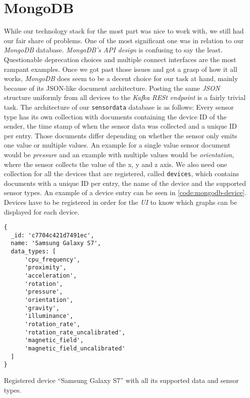 \section{MongoDB}

While our technology stack for the most part was nice to work with, we still had our fair share of
problems. One of the most significant one was in relation to our \textit{MongoDB} database.
\textit{MongoDB’s API design} is confusing to say the least. Questionable deprecation choices and
multiple connect interfaces are the most rampant examples. Once we got past those issues and got a
grasp of how it all works, \textit{MongoDB} does seem to be a decent choice for our task at hand,
mainly because of its JSON-like document architecture. Posting the same \textit{JSON} structure
uniformly from all devices to the \textit{Kafka RESt endpoint} is a fairly trivial task. The
architecture of our \texttt{sensordata} database is as follows: Every sensor type has its own
collection with documents containing the device ID of the sender, the time stamp of when the sensor
data was collected and a unique ID per entry. Those documents differ depending on whether the sensor
only emits one value or multiple values. An example for a single value sensor document would be
\textit{pressure} and an example with multiple values would be \textit{orientation}, where the
sensor collects the value of the x, y and z axis. We also need one collection for all the devices
that are registered, called \texttt{devices}, which contains documents with a unique ID per entry,
the name of the device and the supported sensor types. An example of a device entry can be seen in
\autoref{code:mongodb-device}. Devices have to be registered in order for the \textit{UI} to know
which graphs can be displayed for each device.

\begin{code}[H]
  \centering
  \begin{lstlisting}[language=mongo]
{
  _id: 'c7704c421d7491ec',
  name: 'Samsung Galaxy S7',
  data_types: [
      'cpu_frequency',
      'proximity',
      'acceleration',
      'rotation',
      'pressure',
      'orientation',
      'gravity',
      'illuminance',
      'rotation_rate',
      'rotation_rate_uncalibrated',
      'magnetic_field',
      'magnetic_field_uncalibrated'
  ]
}
  \end{lstlisting}
  \caption{Registered device “Samsung Galaxy S7” with all its supported data and sensor types.}
  \label{code:mongodb-device}
\end{code}

